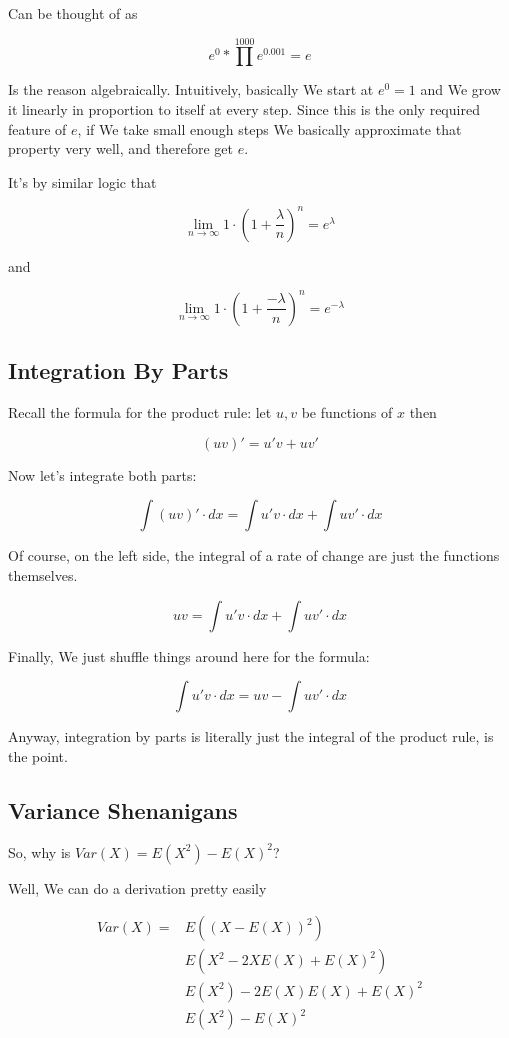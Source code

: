 \documentclass{article}
\begin{document}
		Can be thought of as
		
		\[ e^0 * \prod^{1000} e^{0.001}  = e\]
		
		Is the reason algebraically. Intuitively, basically We start at $e^0 = 1$ and We grow it linearly in proportion to itself at every step. Since this is the only required feature of $e$, if We take small enough steps We basically approximate that property very well, and therefore get $e$.
		
		It's by similar logic that 
		
		\[\lim_{n\to\infty} 1\cdot\left(1+\frac{\lambda}{n}\right)^n  = e^\lambda \]
		
		and
	
		\[\lim_{n\to\infty} 1\cdot\left(1+\frac{-{\lambda}}{n}\right)^n  = e^{-\lambda} \]
		
	\subsection{Integration By Parts}
	
		Recall the formula for the product rule: let $u, v$ be functions of $x$ then
		
		\[ (uv)' =  u'v + uv'\]
		
		Now let's integrate both parts:
		
		\[ \int (uv)'\cdot dx = \int u'v\cdot dx + \int uv'\cdot dx \]
		
		Of course, on the left side, the integral of a rate of change are just the functions themselves.
		
		\[ uv = \int u'v\cdot dx + \int uv'\cdot dx \]
		
		Finally, We just shuffle things around here for the formula:
		
		\[ \int u'v\cdot dx = uv - \int uv'\cdot dx \]
		
		Anyway, integration by parts is literally just the integral of the product rule, is the point. 
				
		
	\subsection{Variance Shenanigans}
			
		So, why is $Var(X) = E(X^2) - E(X)^2$?
		
		Well, We can do a derivation pretty easily
		
		\begin{align*}
		Var(X) =& E((X - E(X))^2)\\
				& E(X^2 - 2XE(X) + E(X)^2) \\
				& E(X^2) - 2E(X)E(X) + E(X)^2 \\
				& E(X^2) - E(X)^2
		\end{align*}
		
\end{document}
